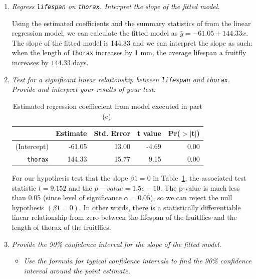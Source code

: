 \documentclass[12pt,letterpaper]{article}
\begin{document}
\begin{enumerate}[label=(\alph*)]
	\item	\emph{Regress \texttt{lifespan} on \texttt{thorax}.  Interpret the slope of the fitted model.}\\
	\vspace{.15cm}
	
	  
		\vspace{.25cm}


Using the estimated coefficients and the summary statistics of from the linear regression model, we can calculate the fitted model as $\hat{y} = -61.05 + 144.33x$. The slope of the fitted model is 144.33 and we can interpret the slope as such: when the length of \texttt{thorax} increases by 1 mm, the average lifespan a fruitfly increases by $144.33$ days.

	\item	\emph{Test for a significant linear relationship between  \texttt{lifespan} and \texttt{thorax}. Provide and interpret your results of your test.}
	
	\begin{table}[h!]
\centering
\caption{Estimated regression coeffiecient from model executed in part (c).}
\label{tab:1}
\begin{tabular}{rrrrr}
  \hline
 & Estimate & Std. Error & t value & Pr($>$$|$t$|$) \\ 
  \hline
(Intercept) & -61.05 & 13.00 & -4.69 & 0.00 \\ 
  \texttt{thorax} & 144.33 & 15.77 & 9.15 & 0.00 \\ 
   \hline
\end{tabular}
\end{table}
		\vspace{.25cm}
For our hypothesis test that the slope $\beta 1=0$ in Table~\ref{tab:1}, the associated test statistic $t = 9.152$ and the $p-value = 1.5e-10$. The p-value is much less than 0.05 (since level of significance $\alpha = 0.05$), so we can reject the null hypothesis $(\beta 1 = 0)$. In other words, there is a statistically differentiable linear relationship from zero between the lifespan of the fruitflies and the length of thorax of the fruitflies. 

		\vspace{.25cm}
	\item \emph{Provide the 90\% confidence interval for the slope of the fitted model.}
	
			\vspace{.15cm}
	\begin{itemize}
		\item
			\emph{Use the formula for typical confidence intervals to find the 90\% confidence interval around the point estimate.}	\\
			

\end{itemize}
\end{enumerate}
\end{document}
